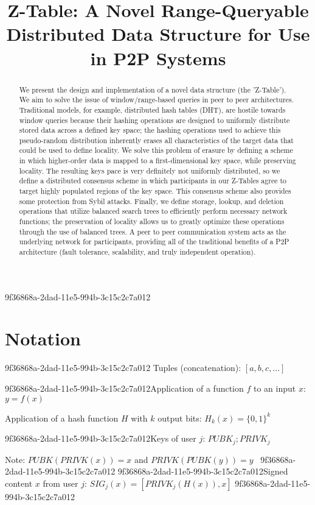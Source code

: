 \documentclass[12pt]{article}
\title{Z-Table: A Novel Range-Queryable Distributed Data Structure for Use in P2P Systems}
\begin{document}
\maketitle
9f36868a-2dad-11e5-994b-3c15c2c7a012
\begin{abstract}
We present the design and implementation of a novel data structure (the 'Z-Table'). We aim to solve the issue of window/range-based queries in peer to peer architectures. Traditional models, for example,  distributed hash tables (DHT), are hostile towards window queries because their hashing operations are designed to uniformly distribute stored data across a defined key space; the hashing operations used to achieve this pseudo-random distribution inherently erases all characteristics of the target data that could be used to define locality. We solve this problem of erasure by defining a scheme in which higher-order data is mapped to a first-dimensional key space, while preserving locality. The resulting keys pace is very definitely not uniformly distributed, so we define a distributed consensus scheme in which participants in our Z-Tables agree to target highly populated regions of the key space. This consensus scheme also provides some protection from Sybil attacks. Finally, we define storage, lookup, and deletion operations that utilize balanced search trees to efficiently perform necessary network functions; the preservation of locality allows us to greatly optimize these operations through the use of balanced trees. A peer to peer communication system acts as the underlying network for participants, providing all of the traditional benefits of a P2P architecture (fault tolerance, scalability, and truly independent operation).
\end{abstract}

\section{Notation}
9f36868a-2dad-11e5-994b-3c15c2c7a012
Tuples (concatenation): $[a,b,c,...]$

9f36868a-2dad-11e5-994b-3c15c2c7a012Application of a function $f$ to an input $x$: $y=f(x)$

Application of a hash function $H$ with $k$ output bits: $H_{k}(x) = \{0,1\}^k$

9f36868a-2dad-11e5-994b-3c15c2c7a012Keys of user $j$: $ PUBK_j; PRIVK_j $

Note: $PUBK(PRIVK(x)) = x$ and $PRIVK(PUBK(y)) = y$~
9f36868a-2dad-11e5-994b-3c15c2c7a012
9f36868a-2dad-11e5-994b-3c15c2c7a012Signed content $x$ from user $j$: $SIG_j(x) = \left[ PRIVK_j( H(x) ), x \right]$
9f36868a-2dad-11e5-994b-3c15c2c7a012
\end{document}
